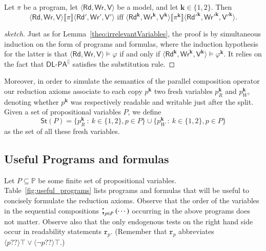 \documentclass{llncs}
\newcommand{\cp}[2]{{#2}^\mathbf{#1}}
\newcommand{\cpr}[2]{\cp{#1}{#2}_R}
\newcommand{\cpw}[2]{\cp{#1}{#2}_W}
\newcommand{\pll}{ {||} }							%
\newcommand{\readable}[1]{\mathtt{r}_{#1}}
\newcommand{\readset}{\mathsf{Rd}}
\newcommand{\valuset}{\mathsf{V}}
\newcommand{\writeset}{\mathsf{Wr}}
\newcommand{\testendo}{?\!\!?}			%
\newcommand{\storeset}{\mathsf{St}}
\newcommand{\DlpaPll}{\ensuremath{\mathsf{DL\text{-}PA}^\pll}\xspace}
\newcommand{\intPgm}[1]{\llbracket #1 \rrbracket}
\newcommand{\ldia}[1]{ \big\langle #1 \big\rangle}
\renewcommand{\phi}{\varphi}
\newcommand{\propset}{\mathbb P}
\newcommand{\propsetOf}[1]{\propset_{#1}}
\newcommand{\seqseq}[1]{ \text{\Large ;}_{#1} ~ }
\newcommand{\set}[1]{\{#1\}}
\newcommand{\suchthat}{~ : ~}
\newcommand{\tuple}[1]{ \langle #1 \rangle}
\begin{document}
\begin{lemma}\label{theo:copies}
Let $\pi$ be a program, 
let $\tuple{\readset,\writeset,\valuset}$ be a model, and 
let $\mathbf{k} \in \set{1,2}$. 
Then 
$$ \tuple{\readset,\writeset,\valuset} \intPgm{\pi} \tuple{\readset',\writeset',\valuset'} \text{ iff } 
\tuple{ \cp k {\readset},\cp k {\writeset},\cp k {\valuset}} \intPgm{\cp k \pi} \tuple{\cp k {\readset'},\cp k {\writeset'},\cp k {\valuset'}} . $$
\end{lemma}
\begin{proof}[sketch]
Just as for Lemma~\ref{theo:irrelevantVariables}, the proof is by simultaneous induction on the form of programs and formulas, where the induction hypothesis for the latter is that 
$\tuple{\readset, \writeset, \valuset} \models \phi$ if and only if
$\tuple{\cp k \readset, \cp k \writeset, \cp k \valuset} \models \cp k \phi$.
It relies on the fact that \DlpaPll satisfies the substitution rule.
\end{proof}

Moreover, in order to simulate the semantics of the parallel composition operator our reduction axioms associate to each copy $\cp k p$ two fresh variables $\cpr k p$ and $\cpw k p$,
denoting whether $\cp k p$ was respectively readable and writable just after the split.
Given a set of propositional variables $P$, we define 
$$\storeset(P) =
\set{ \cpr k p \suchthat k \in \set{1,2}, p \in P} \cup
\set{ \cpw k p \suchthat k \in \set{1,2}, p \in P}$$ 
as the set of all these fresh variables.


\subsection{Useful Programs and formulas}\label{sec:usefulFml}

Let $P \subseteq \propset$ be some finite set of propositional variables. 
Table~\ref{fig:useful_programs} lists programs and formulas that will be useful to concisely formulate the reduction axioms.
%
Observe that the order of the variables in the sequential compositions $ \seqseq{p \in P} ( \cdots ) $ occurring in the above programs does not matter. 
Observe also that the only endogenous tests on the right hand side occur in readability statements $\readable p$. 
(Remember that $\readable p$ abbreviates $\ldia{ p \testendo} \top \lor \ldia{ \lnot p \testendo} \top $.)
\end{document}
